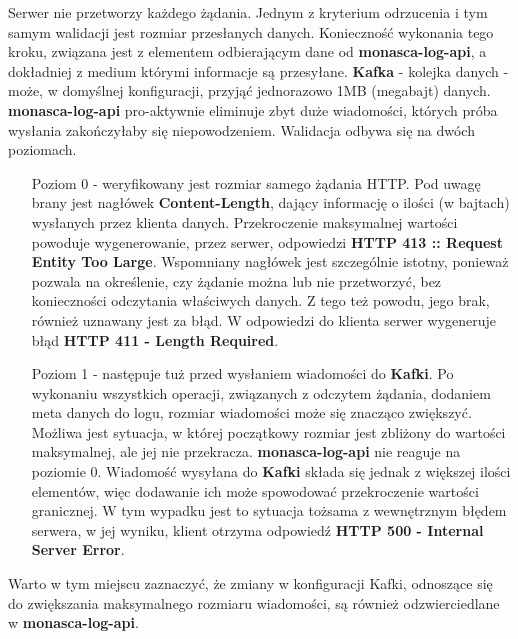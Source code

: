     Serwer nie przetworzy każdego żądania. Jednym z kryterium odrzucenia i
    tym samym walidacji jest rozmiar przesłanych danych. Konieczność wykonania tego kroku, 
    związana jest z elementem odbierającym dane od \textbf{monasca-log-api}, a dokładniej z medium
    którymi informacje są przesyłane. \textbf{Kafka} - kolejka danych - może, w domyślnej konfiguracji,
    przyjąć jednorazowo 1MB (megabajt) danych. \textbf{monasca-log-api} pro-aktywnie eliminuje zbyt duże
    wiadomości, których próba wysłania zakończyłaby się niepowodzeniem. Walidacja odbywa się na dwóch poziomach.
    \begin{itemize}
        \item[Poziom 0] - weryfikowany jest rozmiar samego żądania HTTP. Pod uwagę brany jest nagłówek
        \textbf{Content-Length}, dający informację o ilości (w bajtach) wysłanych przez klienta danych.
        Przekroczenie maksymalnej wartości powoduje wygenerowanie, przez serwer, odpowiedzi 
        \textbf{HTTP 413 :: Request Entity Too Large}. Wspomniany nagłówek jest szczególnie istotny,
        ponieważ pozwala na określenie, czy żądanie można lub nie przetworzyć, bez konieczności
        odczytania właściwych danych. Z tego też powodu, jego brak, również uznawany jest za błąd.
        W odpowiedzi do klienta serwer wygeneruje błąd \textbf{HTTP 411 - Length Required}.
        \item[Poziom 1] - następuje tuż przed wysłaniem wiadomości do \textbf{Kafki}. Po wykonaniu wszystkich
        operacji, związanych z odczytem żądania, dodaniem meta danych do logu, rozmiar wiadomości może się
        znacząco zwiększyć. Możliwa jest sytuacja, w której początkowy rozmiar jest zbliżony do 
        wartości maksymalnej, ale jej nie przekracza. \textbf{monasca-log-api} nie reaguje na poziomie 0. Wiadomość wysyłana do \textbf{Kafki} składa się jednak z większej ilości elementów,
        więc dodawanie ich może spowodować przekroczenie wartości granicznej. W tym wypadku jest to sytuacja
        tożsama z wewnętrznym błędem serwera, w jej wyniku, klient otrzyma odpowiedź
        \textbf{HTTP 500 - Internal Server Error}.
    \end{itemize}
    
    Warto w tym miejscu zaznaczyć, że zmiany w konfiguracji Kafki, odnoszące się do zwiększania
    maksymalnego rozmiaru wiadomości, są również odzwierciedlane w \textbf{monasca-log-api}. 
    
